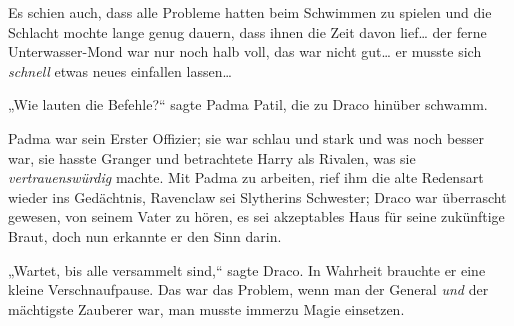 Es schien auch, dass alle Probleme hatten beim Schwimmen zu spielen und die Schlacht mochte lange genug dauern, dass ihnen die Zeit davon lief… der ferne Unterwasser-Mond war nur noch halb voll, das war nicht gut… er musste sich \emph{schnell} etwas neues einfallen lassen…

„Wie lauten die Befehle?“ sagte Padma Patil, die zu Draco hinüber schwamm.

Padma war sein Erster Offizier; sie war schlau und stark und was noch besser war, sie hasste Granger und betrachtete Harry als Rivalen, was sie \emph{vertrauenswürdig} machte. Mit Padma zu arbeiten, rief ihm die alte Redensart wieder ins Gedächtnis, Ravenclaw sei Slytherins Schwester; Draco war überrascht gewesen, von seinem Vater zu hören, es sei akzeptables Haus für seine zukünftige Braut, doch nun erkannte er den Sinn darin.

„Wartet, bis alle versammelt sind,“ sagte Draco. In Wahrheit brauchte er eine kleine Verschnaufpause. Das war das Problem, wenn man der General \emph{und} der mächtigste Zauberer war, man musste immerzu Magie einsetzen.


